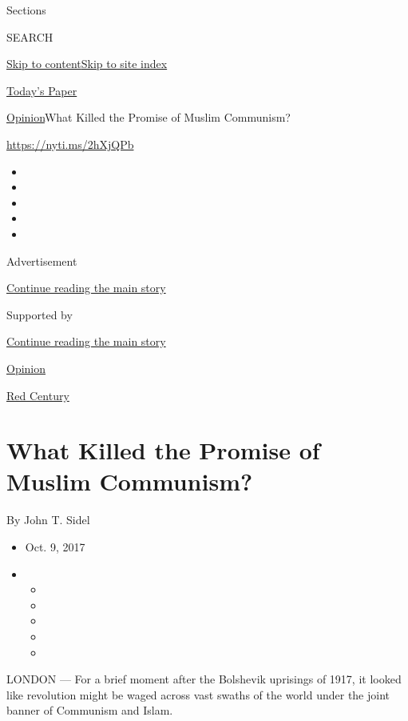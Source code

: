 Sections

SEARCH

\protect\hyperlink{site-content}{Skip to
content}\protect\hyperlink{site-index}{Skip to site index}

\href{https://myaccount.nytimes.com/auth/login?response_type=cookie\&client_id=vi}{}

\href{https://www.nytimes.com/section/todayspaper}{Today's Paper}

\href{/section/opinion}{Opinion}\textbar{}What Killed the Promise of
Muslim Communism?

\href{https://nyti.ms/2hXjQPb}{https://nyti.ms/2hXjQPb}

\begin{itemize}
\item
\item
\item
\item
\item
\end{itemize}

Advertisement

\protect\hyperlink{after-top}{Continue reading the main story}

Supported by

\protect\hyperlink{after-sponsor}{Continue reading the main story}

\href{/section/opinion}{Opinion}

\href{/column/red-century}{Red Century}

\hypertarget{what-killed-the-promise-of-muslim-communism}{%
\section{What Killed the Promise of Muslim
Communism?}\label{what-killed-the-promise-of-muslim-communism}}

By John T. Sidel

\begin{itemize}
\item
  Oct. 9, 2017
\item
  \begin{itemize}
  \item
  \item
  \item
  \item
  \item
  \end{itemize}
\end{itemize}

LONDON --- For a brief moment after the Bolshevik uprisings of 1917, it
looked like revolution might be waged across vast swaths of the world
under the joint banner of Communism and Islam.

